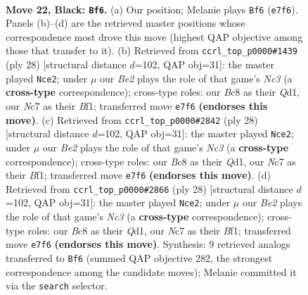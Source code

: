 \documentclass[11pt]{article}
\begin{document}
\begin{figure}[p]\centering
\begin{subfigure}{0.46\textwidth}\centering
\resizebox{\linewidth}{!}{%
\newchessgame
\chessboard[
  setfen={1rbq1r1k/p1n1b3/6pp/2pp1p1n/P4P2/1P3NP1/Q2NP1BP/1RB1R2K b - - 1 22},
  showmover=false,
  pgfstyle=straightmove, color=movearrow, markmove={e7-f6}
]}
\caption{}
\end{subfigure}\hfill
\begin{subfigure}{0.46\textwidth}\centering
\resizebox{\linewidth}{!}{%
\newchessgame
\chessboard[
  setfen={rn1qk2r/1b1n1pp1/p3p2p/2bpP3/3N1PPP/2N1B3/1PP2K2/R2Q1B1R w kq - 2 15},
  showmover=false,
  pgfstyle=straightmove, color=movearrow, markmove={c3-e2}
]}
\caption{}
\end{subfigure}
\\[4pt]
\begin{subfigure}{0.46\textwidth}\centering
\resizebox{\linewidth}{!}{%
\newchessgame
\chessboard[
  setfen={rn1qk2r/1b1n1pp1/p3p2p/2bpP3/3N1PPP/2N1B3/1PP2K2/R2Q1B1R w kq - 2 15},
  showmover=false,
  pgfstyle=straightmove, color=movearrow, markmove={c3-e2}
]}
\caption{}
\end{subfigure}\hfill
\begin{subfigure}{0.46\textwidth}\centering
\resizebox{\linewidth}{!}{%
\newchessgame
\chessboard[
  setfen={rn1qk2r/1b1n1pp1/p3p2p/2bpP3/3N1PPP/2N1B3/1PP2K2/R2Q1B1R w kq - 2 15},
  showmover=false,
  pgfstyle=straightmove, color=movearrow, markmove={c3-e2}
]}
\caption{}
\end{subfigure}
\caption{\textbf{Move 22, Black: \texttt{Bf6}.} (a) Our position; Melanie plays \texttt{Bf6} (\texttt{e7f6}). Panels (b)--(d) are the retrieved master positions whose correspondence most drove this move (highest QAP objective among those that transfer to it). (b) Retrieved from \texttt{ccrl\_top\_p0000\#1439} (ply 28) [structural distance $d$=102, QAP obj=31]: the master played \texttt{Nce2}; under $\mu$ our \emph{Be2} plays the role of that game's \emph{Nc3} (a \textbf{cross-type} correspondence); cross-type roles: our \emph{B}c8 as their \emph{Q}d1, our \emph{N}c7 as their \emph{B}f1; transferred move \texttt{e7f6} \textbf{(endorses this move)}. (c) Retrieved from \texttt{ccrl\_top\_p0000\#2842} (ply 28) [structural distance $d$=102, QAP obj=31]: the master played \texttt{Nce2}; under $\mu$ our \emph{Be2} plays the role of that game's \emph{Nc3} (a \textbf{cross-type} correspondence); cross-type roles: our \emph{B}c8 as their \emph{Q}d1, our \emph{N}c7 as their \emph{B}f1; transferred move \texttt{e7f6} \textbf{(endorses this move)}. (d) Retrieved from \texttt{ccrl\_top\_p0000\#2866} (ply 28) [structural distance $d$=102, QAP obj=31]: the master played \texttt{Nce2}; under $\mu$ our \emph{Be2} plays the role of that game's \emph{Nc3} (a \textbf{cross-type} correspondence); cross-type roles: our \emph{B}c8 as their \emph{Q}d1, our \emph{N}c7 as their \emph{B}f1; transferred move \texttt{e7f6} \textbf{(endorses this move)}. Synthesis: 9 retrieved analogs transferred to \texttt{Bf6} (summed QAP objective 282, the strongest correspondence among the candidate moves); Melanie committed it via the \texttt{search} selector.}
\label{fig:thought-m43}
\end{figure}
\end{document}
